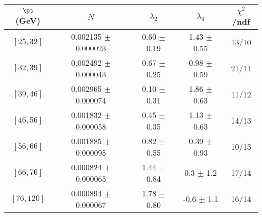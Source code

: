 \begin{tabular}{c||c|c|c|c}
$\pt$ (GeV) & $N$ & $\lambda_{2}$ & $\lambda_4$  & $\chi^2$/ndf  \\
\hline
$[25, 32]$ & 0.002135 $\pm$ 0.000023 & 0.60 $\pm$ 0.19 & 1.43 $\pm$ 0.55 & 13/10\\
$[32, 39]$ & 0.002492 $\pm$ 0.000043 & 0.67 $\pm$ 0.25 & 0.98 $\pm$ 0.59 & 21/11\\
$[39, 46]$ & 0.002965 $\pm$ 0.000074 & 0.10 $\pm$ 0.31 & 1.86 $\pm$ 0.63 & 11/12\\
$[46, 56]$ & 0.001832 $\pm$ 0.000058 & 0.45 $\pm$ 0.35 & 1.13 $\pm$ 0.63 & 14/13\\
$[56, 66]$ & 0.001885 $\pm$ 0.000095 & 0.82 $\pm$ 0.55 & 0.39 $\pm$ 0.93 & 10/13\\
$[66, 76]$ & 0.000824 $\pm$ 0.000065 & 1.44 $\pm$ 0.84 & 0.3 $\pm$ 1.2 & 17/14\\
$[76, 120]$ & 0.000894 $\pm$ 0.000067 & 1.78 $\pm$ 0.80 & -0.6 $\pm$ 1.1 & 16/14\\
\end{tabular}
